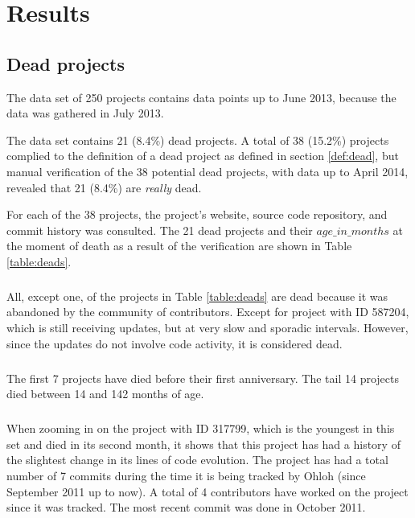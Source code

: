 \chapter{Results}
\label{results}

\section{Dead projects}
\label{section:deads}
The data set of 250 projects contains data points up to June 2013, because the
data was gathered in July 2013.

The data set contains 21 (8.4\%) dead projects. A total of 38 (15.2\%) projects
complied to the definition of a dead project as defined in section
\ref{def:dead}, but manual verification of the 38 potential dead projects, with
data up to April 2014, revealed that 21 (8.4\%) are \emph{really }\rm dead.

For each of the 38 projects, the project's website, source code repository, and
commit history was consulted. The 21 dead projects and their $age\_in\_months$
at the moment of death as a result of the verification are shown in Table
\ref{table:deads}.



\paragraph{}
All, except one, of the projects in Table \ref{table:deads} are dead because it
was abandoned by the community of contributors. Except for project with ID
587204, which is still receiving updates, but at very slow and sporadic
intervals. However, since the updates do not involve code activity, it is
considered dead.

\paragraph{}
The first 7 projects have died before their first anniversary. The tail 14
projects died between 14 and 142 months of age.

\paragraph{}
When zooming in on the project with ID 317799, which is the youngest in this set
and died in its second month, it shows that this project has had a history of
the slightest change in its lines of code evolution. The project has had a total
number of 7 commits during the time it is being tracked by Ohloh (since
September 2011 up to now). A total of 4 contributors have worked on the project
since it was tracked. The most recent commit was done in October 2011.

